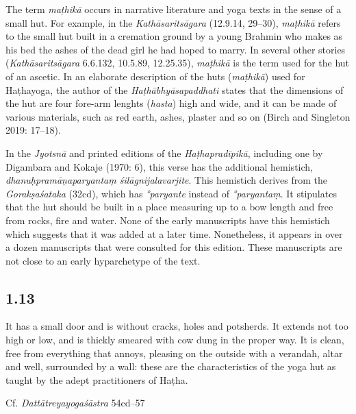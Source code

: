 \begin{ekdosis}
\begin{testimonia}[hp01_012]
\end{testimonia}

\begin{philcomm}[hp01_012]  
The term \emph{maṭhikā} occurs in narrative literature and yoga texts in the sense of a small hut. For example, in the \textit{Kathāsaritsāgara} (12.9.14, 29–30), \emph{maṭhikā} refers to the small hut built in a cremation ground by a young Brahmin who makes as his bed the ashes of the dead girl he had hoped to marry. In several other stories (\textit{Kathāsaritsāgara} 6.6.132, 10.5.89, 12.25.35), \emph{maṭhikā} is the term used for the hut of an ascetic. In an elaborate description of the huts (\emph{maṭhikā}) used for Haṭhayoga, the author of the \emph{Haṭhābhyāsapaddhati} states that the dimensions of the hut are four fore-arm lenghts (\emph{hasta}) high and wide, and it can be made of various materials, such as red earth, ashes, plaster and so on (Birch and Singleton 2019: 17–18).

In the \emph{Jyotsnā} and printed editions of the \emph{Haṭhapradīpikā}, including one by Digambara and Kokaje (1970: 6), this verse has the additional hemistich, \emph{dhanuḥpramāṇaparyantaṃ śilāgnijalavarjite}. This hemistich derives from the \emph{Gorakṣaśataka} (32cd), which has \emph{°paryante} instead of \emph{°paryantaṃ}. It stipulates that the hut should be built in a place measuring up to a bow length and free from rocks, fire and water. None of the early manuscripts have this hemistich which suggests that it was added at a later time. Nonetheless, it appears in over a dozen manuscripts that were consulted for this edition. These manuscripts are not close to an early hyparchetype of the text.
\end{philcomm}

\subsection*{1.13}
\begin{translation}[hp01_013]
It has a small door and is without cracks, holes and potsherds. It extends not too high or low, and is thickly smeared with cow dung in the proper way. It is clean, free from everything that annoys, pleasing on the outside with a verandah, altar and well, surrounded by a wall: these are the characteristics of the yoga hut as taught by the adept practitioners of Haṭha.
\end{translation}

\begin{sources}[hp01_013]
Cf. \emph{Dattātreyayogaśāstra} 54cd–57


\end{sources}
\end{ekdosis}
